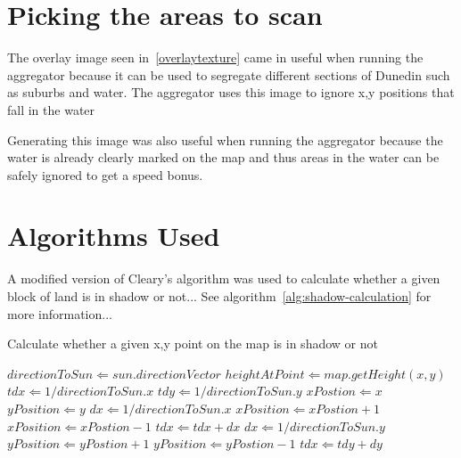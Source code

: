 \documentclass[12pt]{report}
\begin{document}
\section{Picking the areas to scan}
The overlay image seen in~\ref{overlaytexture} came in useful when running the aggregator because it can be used to segregate different sections of Dunedin such as suburbs and water. The aggregator uses this image to ignore x,y positions that fall in the water 

Generating this image was also useful when running the aggregator because the water is already clearly marked on the map and thus areas in the water can be safely ignored to get a speed bonus. 



\section{Algorithms Used}
A modified version of Cleary's algorithm was used to calculate whether a given block of land is in shadow or not... See algorithm~\ref{alg:shadow-calculation} for more information... 



\begin{algorithm}[h]
\caption{Calculate whether a given x,y point on the map is in shadow or not}
\label{alg:shadow-calculation}%
\begin{algorithmic}           %
\STATE $directionToSun \Leftarrow sun.directionVector$
\STATE $heightAtPoint \Leftarrow map.getHeight(x,y)$
\STATE $tdx \Leftarrow 1 / directionToSun.x$
\STATE $tdy \Leftarrow 1 / directionToSun.y$
\STATE $xPostion \Leftarrow x$
\STATE $yPosition \Leftarrow y$
	\ENDIF
		\STATE $dx \Leftarrow 1 / directionToSun.x$
			\STATE $xPosition \Leftarrow xPostion + 1$	
		\ELSE
			\STATE $xPosition \Leftarrow xPostion - 1$	
		\ENDIF
		\STATE $tdx \Leftarrow tdx + dx$
	\ELSE
		\STATE $dx \Leftarrow 1 / directionToSun.y$
			\STATE $yPosition \Leftarrow yPostion + 1$	
		\ELSE
			\STATE $yPosition \Leftarrow yPostion - 1$	
		\ENDIF
		\STATE $tdx \Leftarrow tdy + dy$		
	\ENDIF
\ENDWHILE
{}
\end{algorithmic}
\end{algorithm}
\end{document}
